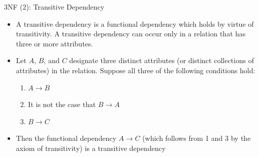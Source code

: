 \documentclass[aspectratio=169, xcolor=dvipsnames]{beamer}
\begin{document}
\begin{frame}{3NF (2): Transitive Dependency}
    \begin{itemize}[<+->]
        \item A transitive dependency is a functional dependency which holds by virtue of transitivity. A transitive dependency can occur only in a relation that has three or more attributes.
        \item Let $A$, $B$, and $C$ designate three distinct attributes (or distinct collections of attributes) in the relation. Suppose all three of the following conditions hold:
        \begin{enumerate}
            \item $A \rightarrow B$
            \item It is not the case that $B \rightarrow A$
            \item $B \rightarrow C$
        \end{enumerate}
        \item Then the functional dependency $A \rightarrow C$ (which follows from 1 and 3 by the axiom of transitivity) is a transitive dependency
    \end{itemize}
\end{frame}
\end{document}
